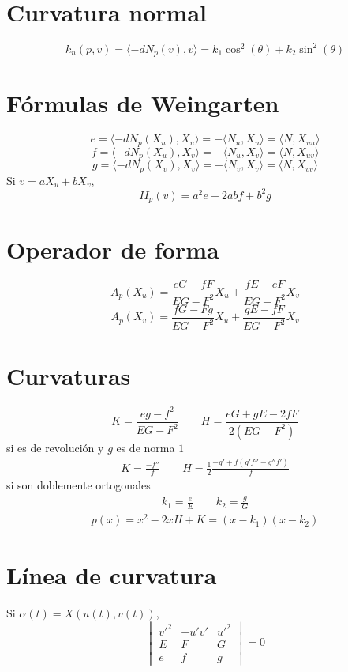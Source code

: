 \documentclass[8pt]{article}
\begin{document}
\scriptsize
\begin{multicols}{3}

\section*{Curvatura normal}
\[
k_n(p, v) = \langle -dN_p(v), v \rangle = k_1 \cos^2(\theta) + k_2 \sin^2(\theta)
\]

\section*{Fórmulas de Weingarten}
\[
e = \langle -dN_p(X_u), X_u \rangle = - \langle N_u, X_u \rangle = \langle N, X_{uu} \rangle
\]
\[
f = \langle -dN_p(X_u), X_v \rangle = - \langle N_u, X_v \rangle = \langle N, X_{uv} \rangle
\]
\[
g = \langle -dN_p(X_v), X_v \rangle = - \langle N_v, X_v \rangle = \langle N, X_{vv} \rangle
\]
Si $v = aX_u + bX_v$,
\[
II_p(v) = a^2 e + 2abf + b^2 g
\]

\section*{Operador de forma}
\[
A_p(X_u) =
\frac{eG - fF}{EG - F^2} X_u +
\frac{fE - eF}{EG - F^2} X_v
\]
\[
A_p(X_v) =
\frac{fG - Fg}{EG - F^2} X_u +
\frac{gE - fF}{EG - F^2} X_v
\]

\section*{Curvaturas}
\[
K = \frac{eg - f^2}{EG - F^2}
\qquad
H = \frac{eG + gE - 2fF}{2(EG - F^2)}
\]
  si es de revolución y $g$ es de norma $1$ 
\begin{align*}
  K=\frac{-f''}{f} \qquad H=\frac{1}{2}\frac{-g'+f(g'f''-g''f')}{f}
\end{align*}
si son doblemente ortogonales
\begin{align*}
  k_1=\frac{e}{E}\qquad k_2=\frac{g}{G}
\end{align*}
\begin{align*}
  p(x)=x^2-2xH+K=(x-k_1)(x-k_2)
\end{align*}
\section*{Línea de curvatura}
Si $\alpha(t) = X(u(t), v(t))$,
\[
\begin{vmatrix}
v'^2 & -u'v' & u'^2 \\
E & F & G \\
e & f & g
\end{vmatrix} = 0
\]


\end{multicols}
\end{document}
